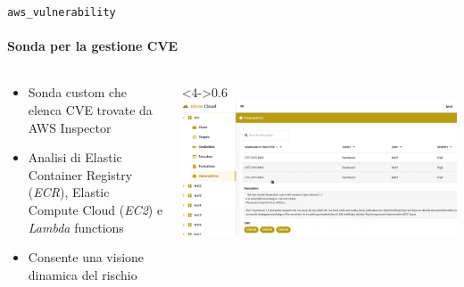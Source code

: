 \documentclass{beamer}
\begin{document}
\begin{frame}{\texttt{aws\_vulnerability}}
    \framesubtitle{Sonda per la gestione CVE}
    \begin{columns}
        \begin{column}{0.4\textwidth}
            \begin{itemize}
            \item<1-> Sonda custom che elenca CVE trovate da AWS Inspector
            \item<2-> Analisi di Elastic Container Registry (\emph{ECR}), 
                Elastic Compute Cloud (\emph{EC2}) e \emph{Lambda} functions
            \item<3-> Consente una visione dinamica del rischio
        \end{itemize}
        \end{column}
        \begin{column}<4->{0.6\textwidth}
            \includegraphics[width=\textwidth]{assets/Screenshot 2025-07-08 at 10.56.53.png}
        \end{column}
    \end{columns}
\end{frame}
\end{document}
